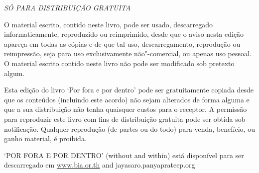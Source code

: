 \emph{SÓ PARA DISTRIBUIÇÃO GRATUITA}

O material escrito, contido neste livro, pode ser usado, descarregado
informaticamente, reproduzido ou reimprimido, desde que o aviso nesta
edição apareça em todas as cópias e de que tal uso, descarregamento,
reprodução ou reimpressão, seja para uso exclusivamente não"-comercial,
ou apenas uso pessoal. O material escrito contido neste livro não pode
ser modificado sob pretexto algum.

Esta edição do livro `Por fora e por dentro' pode ser gratuitamente
copiada desde que os conteúdos (incluindo este acordo) não sejam
alterados de forma alguma e que a sua distribuição não tenha quaisquer
custos para o receptor. A permissão para reproduzir este livro com fins
de distribuição gratuita pode ser obtida sob notificação. Qualquer
reprodução (de partes ou do todo) para venda, benefício, ou ganho
material, é proibida.

`POR FORA E POR DENTRO' (without and within) está disponível para
ser descarregado em \href{http://www.bia.or.th}{www.bia.or.th} {and
jayasaro.panyaprateep.org}

